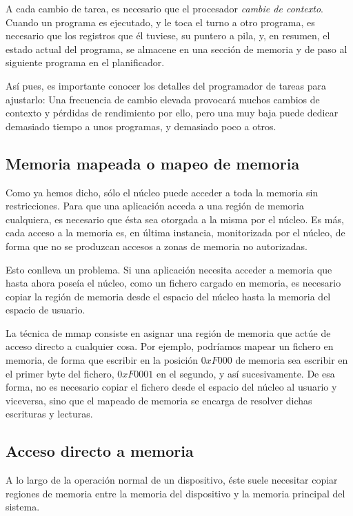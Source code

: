 A cada cambio de tarea, es necesario que el procesador \emph{cambie de contexto}. Cuando un 
programa es ejecutado, y le toca el turno a otro programa, es necesario que los registros que él tuviese, su puntero a 
pila, y, en resumen, el estado actual del programa, se almacene en una sección de memoria y de paso al siguiente 
programa en el planificador.

Así pues, es importante conocer los detalles del programador de tareas para ajustarlo: Una frecuencia de cambio elevada 
provocará muchos cambios de contexto y pérdidas de rendimiento por ello, pero una muy baja puede dedicar demasiado 
tiempo a unos programas, y demasiado poco a otros.

\subsection{Memoria mapeada o mapeo de memoria}
Como ya hemos dicho, sólo el núcleo puede acceder a toda la memoria sin restricciones. Para que una aplicación acceda a 
una región de memoria cualquiera, es necesario que ésta sea otorgada a la misma por el núcleo. Es más, cada acceso a 
la memoria es, en última instancia, monitorizada por el núcleo, de forma que no se produzcan accesos a zonas de memoria 
no autorizadas.

Esto conlleva un problema. Si una aplicación necesita acceder a memoria que hasta ahora poseía el núcleo, como un 
fichero cargado en memoria, es necesario copiar la región de memoria desde el espacio del núcleo hasta la memoria del 
espacio de usuario.

La técnica de \gls{mmap} consiste en asignar una región de memoria que actúe de acceso directo a 
cualquier cosa. Por ejemplo, podríamos mapear un fichero en memoria, de forma que escribir en la posición $0xF000$ de 
memoria sea escribir en el primer byte del fichero, $0xF0001$ en el segundo, y así sucesivamente. De esa forma, no es 
necesario copiar el fichero desde el espacio del núcleo al usuario y viceversa, sino que el mapeado de memoria se 
encarga de resolver dichas escrituras y lecturas.

\subsection{Acceso directo a memoria}
A lo largo de la operación normal de un dispositivo, éste suele necesitar copiar regiones de memoria entre la memoria 
del dispositivo y la memoria principal del sistema.

